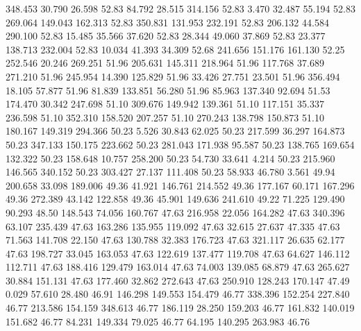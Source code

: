  348.453   30.790   26.598        52.83
  84.792   28.515  314.156        52.83
   3.470   32.487   55.194        52.83
 269.064  149.043  162.313        52.83
 350.831  131.953  232.191        52.83
 206.132   44.584  290.100        52.83
  15.485   35.566   37.620        52.83
  28.344   49.060   37.869        52.83
  23.377  138.713  232.004        52.83
  10.034   41.393   34.309        52.68
 241.656  151.176  161.130        52.25
 252.546   20.246  269.251        51.96
 205.631  145.311  218.964        51.96
 117.768   37.689  271.210        51.96
 245.954   14.390  125.829        51.96
  33.426   27.751   23.501        51.96
 356.494   18.105   57.877        51.96
  81.839  133.851   56.280        51.96
  85.963  137.340   92.694        51.53
 174.470   30.342  247.698        51.10
 309.676  149.942  139.361        51.10
 117.151   35.337  236.598        51.10
 352.310  158.520  207.257        51.10
 270.243  138.798  150.873        51.10
 180.167  149.319  294.366        50.23
   5.526   30.843   62.025        50.23
 217.599   36.297  164.873        50.23
 347.133  150.175  223.662        50.23
 281.043  171.938   95.587        50.23
 138.765  169.654  132.322        50.23
 158.648   10.757  258.200        50.23
  54.730   33.641    4.214        50.23
 215.960  146.565  340.152        50.23
 303.427   27.137  111.408        50.23
  58.933   46.780    3.561        49.94
 200.658   33.098  189.006        49.36
  41.921  146.761  214.552        49.36
 177.167   60.171  167.296        49.36
 272.389   43.142  122.858        49.36
  45.901  149.636  241.610        49.22
  71.225  129.490   90.293        48.50
 148.543   74.056  160.767        47.63
 216.958   22.056  164.282        47.63
 340.396   63.107  235.439        47.63
 163.286  135.955  119.092        47.63
  32.615   27.637   47.335        47.63
  71.563  141.708   22.150        47.63
 130.788   32.383  176.723        47.63
 321.117   26.635   62.177        47.63
 198.727   33.045  163.053        47.63
 122.619  137.477  119.708        47.63
  64.627  146.112  112.711        47.63
 188.416  129.479  163.014        47.63
  74.003  139.085   68.879        47.63
 265.627   30.884  151.131        47.63
 177.460   32.862  272.643        47.63
 250.910  128.243  170.147        47.49
   0.029   57.610   28.480        46.91
 146.298  149.553  154.479        46.77
 338.396  152.254  227.840        46.77
 213.586  154.159  348.613        46.77
 186.119   28.250  159.203        46.77
 161.832  140.019  151.682        46.77
  84.231  149.334   79.025        46.77
  64.195  140.295  263.983        46.76
